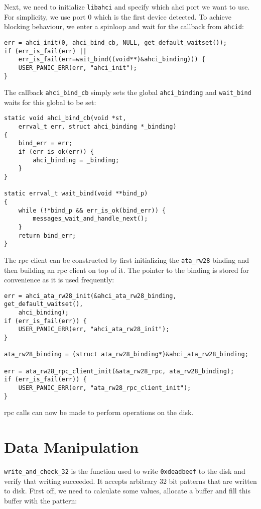 Next, we need to initialize \verb+libahci+ and specify which \ac{ahci} port we
want to use. For simplicity, we use port $0$ which is the first device
detected. To achieve blocking behaviour, we enter a spinloop and wait for the
callback from \verb+ahcid+:

\begin{lstlisting}
err = ahci_init(0, ahci_bind_cb, NULL, get_default_waitset());
if (err_is_fail(err) || 
    err_is_fail(err=wait_bind((void**)&ahci_binding))) {
    USER_PANIC_ERR(err, "ahci_init");
}
\end{lstlisting}

The callback \lstinline+ahci_bind_cb+ simply sets the global
\lstinline+ahci_binding+ and \lstinline+wait_bind+ waits for this global to be
set:

\begin{lstlisting}
static void ahci_bind_cb(void *st, 
    errval_t err, struct ahci_binding *_binding)
{
    bind_err = err;
    if (err_is_ok(err)) {
        ahci_binding = _binding;
    }
}

static errval_t wait_bind(void **bind_p)
{
    while (!*bind_p && err_is_ok(bind_err)) {
        messages_wait_and_handle_next();
    }
    return bind_err;
}
\end{lstlisting}

The \acs{rpc} client can be constructed by first initializing the
\lstinline+ata_rw28+ binding and then building an \acs{rpc} client on top of
it. The pointer to the binding is stored for convenience as it is used
frequently:

\begin{lstlisting}
err = ahci_ata_rw28_init(&ahci_ata_rw28_binding, get_default_waitset(), 
    ahci_binding);
if (err_is_fail(err)) {
    USER_PANIC_ERR(err, "ahci_ata_rw28_init");
}

ata_rw28_binding = (struct ata_rw28_binding*)&ahci_ata_rw28_binding;

err = ata_rw28_rpc_client_init(&ata_rw28_rpc, ata_rw28_binding);
if (err_is_fail(err)) {
    USER_PANIC_ERR(err, "ata_rw28_rpc_client_init");
}
\end{lstlisting}

\acs{rpc} calls can now be made to perform operations on the disk.

\section{Data Manipulation}

\lstinline+write_and_check_32+ is the function used to write
\lstinline+0xdeadbeef+ to the disk and verify that writing succeeded. It
accepts arbitrary 32 bit patterns that are written to disk.  First off, we need
to calculate some values, allocate a buffer and fill this buffer with the
pattern:

